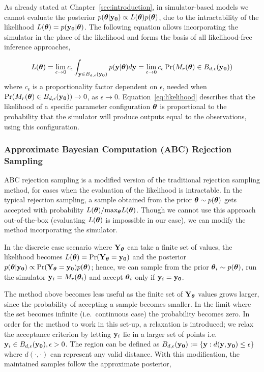 As already stated at Chapter~\ref{sec:introduction}, in
simulator-based models we cannot evaluate the posterior
$p(\boldsymbol{\theta}|\mathbf{y_0}) \propto L(\boldsymbol{\theta})p(\boldsymbol{\theta})$, due to the
intractability of the likelihood $L(\boldsymbol{\theta}) = p(\mathbf{y_0}|\boldsymbol{\theta})$. The
following equation allows incorporating the simulator in the place of
the likelihood and forms the basis of all likelihood-free inference
approaches,

\begin{equation} \label{eq:likelihood}
  L(\boldsymbol{\theta}) =
  \lim_{\epsilon \to 0} c_\epsilon \int_{\mathbf{y} \in B_{d,\epsilon}(\mathbf{y_0})} p(\mathbf{y}|\boldsymbol{\theta})d\mathbf{y} =
  \lim_{\epsilon \to 0} c_\epsilon \Pr(M_r(\boldsymbol{\theta}) \in B_{d,\epsilon}(\mathbf{y_0}))
\end{equation}
%
where $c_\epsilon$ is a proportionality factor dependent on
$\epsilon$, needed when
$\Pr(M_r(\boldsymbol{\theta}) \in B_{d, \epsilon}(\mathbf{y_0})) \rightarrow 0$, as
$\epsilon \rightarrow 0$. Equation~\ref{eq:likelihood} describes that
the likelihood of a specific parameter configuration $\boldsymbol{\theta}$ is
proportional to the probability that the simulator will produce
outputs equal to the observations, using this configuration.

\subsubsection{Approximate Bayesian Computation (ABC) Rejection
  Sampling}

ABC rejection sampling is a modified version of the traditional
rejection sampling method, for cases when the evaluation of the
likelihood is intractable. In the typical rejection sampling, a sample
obtained from the prior $\boldsymbol{\theta} \sim p(\boldsymbol{\theta})$ gets accepted
with probability $L(\boldsymbol{\theta})/ \text{max}_{\boldsymbol{\theta}}
L(\boldsymbol{\theta})$. Though we cannot use this approach out-of-the-box
(evaluating $L(\boldsymbol{\theta})$ is impossible in our case), we can
modify the method incorporating the simulator.

In the discrete case scenario where $\mathbf{Y}_{\boldsymbol{\theta}}$ can take a finite
set of values, the likelihood becomes
$L(\boldsymbol{\theta}) = \Pr(\mathbf{Y}_{\boldsymbol{\theta}} = \mathbf{y_0})$ and the posterior
$p(\boldsymbol{\theta}|\mathbf{y_0}) \propto \Pr(\mathbf{Y}_{\boldsymbol{\theta}}=\mathbf{y_0})p(\boldsymbol{\theta})$; hence, we can
sample from the prior $\boldsymbol{\theta}_i \sim p(\boldsymbol{\theta})$, run the simulator
$\mathbf{y}_i = M_r(\boldsymbol{\theta}_i)$ and accept $\boldsymbol{\theta}_i$ only if
$\mathbf{y}_i = \mathbf{y_0}$.

The method above becomes less useful as the finite set of
$\mathbf{Y}_{\boldsymbol{\theta}}$ values grows larger, since the probability of
accepting a sample becomes smaller. In the limit
where the set becomes infinite (i.e.\ continuous case) the probability
becomes zero. In order for the method to work in this set-up, a
relaxation is introduced; we relax the acceptance criterion by letting
$\mathbf{y}_{i}$ lie in a larger set of points i.e.\
$\mathbf{y}_{i} \in B_{d,\epsilon}(\mathbf{y_0}), \epsilon > 0$. The region can be
defined as $B_{d,\epsilon} (\mathbf{y_0}) := \{\mathbf{y}: d(\mathbf{y}, \mathbf{y_0}) \leq \epsilon \}$
where $d(\cdot, \cdot)$ can represent any valid distance. With this
modification, the maintained samples follow the approximate posterior,

